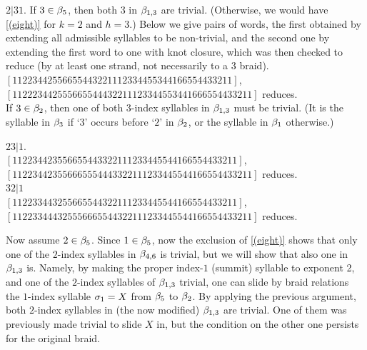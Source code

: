 \begin{caselist}
\begin{caselist}
\begin{caselist}
\case
$2|31$. If $3\in \beta_5$, then both $3$ in $\beta_{1,3}$ are trivial.
(Otherwise, we would have \eqref{(eight)} for $k=2$ and $h=3$.)
Below we give pairs of words, the first obtained by extending all
admissible syllables to be non-trivial, and the second one by
extending the first word to one with knot closure, which was then
checked to reduce (by at least one strand, not necessarily to a
3 braid).
\\
$[1122344  2 55665544322111   2334455 3441 66554433211]$, \\
$[11222344 2 5556655444322111 2334455 3441 666554433211]$ reduces. \\
\case
If $3\in \beta_2$, then one of both $3$-index syllables in
$\beta_{1,3}$ must be trivial. (It is the syllable in $\beta_3$ if `$3$'
occurs before `$2$' in $\beta_2$, or the syllable in $\beta_1$
otherwise.)

\begin{caselist}
\case
$ 23|1$.
\\
$[1122344 23 556655443322111    2334455 441 66554433211]$, \\
$[1122344 23 556665554443322111 2334455 441 66554433211]$ reduces. \\
\case $ 32|1$
\\
$[11223344  32 55665544322111   2334455 441 66554433211]$, \\
$[112233444 32 5556665544322111 2334455 441 66554433211]$ reduces.  \\
\end{caselist}
\end{caselist}

\case
Now assume $2\in\beta_5$. Since $1\in\beta_5$, now the exclusion
of \eqref{(eight)} shows that only one of the $2$-index syllables
in $\beta_{4,6}$ is trivial, but we will show that also one in
$\beta_{1,3}$ is. Namely, by making the proper index-$1$ (summit)
syllable to exponent 2, and one of the $2$-index syllables of $\beta_
{1,3}$ trivial, one can slide by braid relations the $1$-index
syllable $\sigma_1=X$ from $\beta_5$ to $\beta_2$.
By applying the previous argument, both
$2$-index syllables in (the now modified) $\beta_{1,3}$ are trivial.
One of them was previously made trivial to slide $X$ in, but the
condition on the other one persists for the original braid.



\end{caselist}
\end{caselist}
